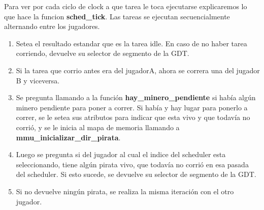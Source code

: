 \documentclass[a4paper,10pt]{article}
\begin{document}
  Para ver por cada ciclo de clock a que tarea le toca ejecutarse explicaremos lo que hace la funcion \textbf{sched\_tick}.
  Las tareas se ejecutan secuencialmente alternando entre los jugadores.
  \begin{enumerate}
    \item Setea el resultado estandar que es la tarea idle. En caso de no haber tarea corriendo, devuelve su selector de segmento de la GDT.
    \item Si la tarea que corrio antes era del jugadorA, ahora se correra una del jugador B y viceversa.
    \item Se pregunta llamando a la función \textbf{hay\_minero\_pendiente} si había algún minero pendiente para poner a correr.
      Si había y hay lugar para ponerlo a correr, se le setea sus atributos para indicar que esta vivo y que todavía no corrió, y 
      se le inicia al mapa de memoria llamando a \textbf{mmu\_inicializar\_dir\_pirata}.
    \item Luego se pregunta si del jugador al cual el indice del scheduler esta seleccionando, tiene algún pirata vivo, que todavía no
      corrió en esa pasada del scheduler. Si esto sucede, se devuelve su selector de segmento de la GDT.
    \item Si no devuelve ningún pirata, se realiza la misma iteración con el otro jugador.
  \end{enumerate}
\end{document}
